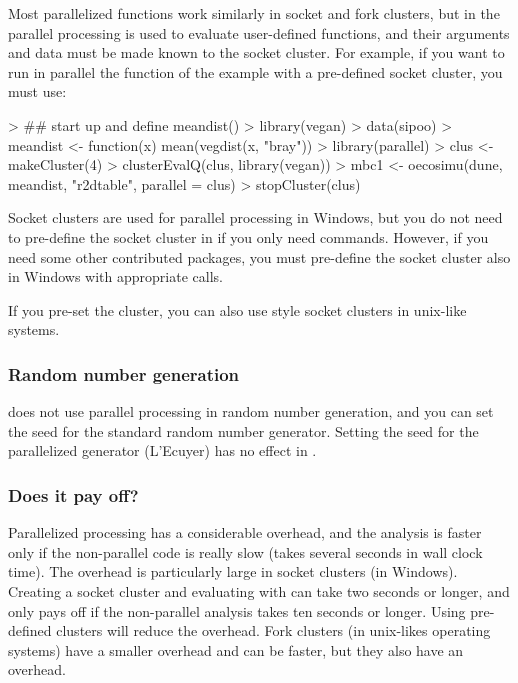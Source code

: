 \documentclass[a4paper,10pt,twocolumn]{article}
\begin{document}
Most parallelized  functions work similarly in socket and
fork clusters, but in  the parallel processing is used
to evaluate user-defined functions, and their arguments and data must
be made known to the socket cluster.  For example, if you want to run
in parallel the  function of the 
example with a pre-defined socket cluster, you must use:
\begin{Schunk}
\begin{Sinput}
> ## start up and define meandist()
> library(vegan)
> data(sipoo)
> meandist <- 
      function(x) mean(vegdist(x, "bray"))
> library(parallel)
> clus <- makeCluster(4)
> clusterEvalQ(clus, library(vegan))
> mbc1 <- oecosimu(dune, meandist, "r2dtable", 
                   parallel = clus)
> stopCluster(clus)
\end{Sinput}
\end{Schunk}
Socket clusters are used for parallel processing in Windows, but you
do not need to pre-define the socket cluster in  if you
only need  commands.  However, if you need some other
contributed packages, you must pre-define the socket cluster also in
Windows with appropriate  calls.

If you pre-set the cluster, you can also use  style socket
clusters in unix-like systems.

\subsubsection{Random number generation}

 does not use parallel processing in random number
generation, and you can set the seed for the standard random number
generator. Setting the seed for the parallelized generator (L'Ecuyer)
has no effect in .

\subsubsection{Does it pay off?}

Parallelized processing has a considerable overhead, and the analysis
is faster only if the non-parallel code is really slow (takes several
seconds in wall clock time). The overhead is particularly large in
socket clusters (in Windows). Creating a socket cluster and evaluating
 with  can take two seconds or
longer, and only pays off if the non-parallel analysis takes ten
seconds or longer. Using pre-defined clusters will reduce the
overhead. Fork clusters (in unix-likes operating systems) have a
smaller overhead and can be faster, but they also have an overhead.
\end{document}
